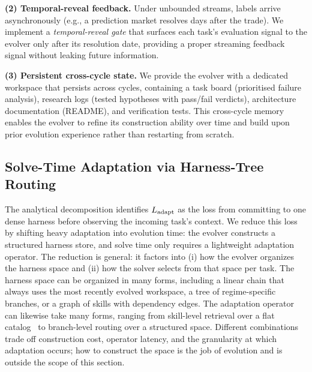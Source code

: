 \noindent\textbf{(2) Temporal-reveal feedback.}
Under unbounded streams, labels arrive asynchronously (e.g., a prediction market resolves days after the trade). We implement a \emph{temporal-reveal gate} that surfaces each task's evaluation signal to the evolver only after its resolution date, providing a proper streaming feedback signal without leaking future information.

\noindent\textbf{(3) Persistent cross-cycle state.}
We provide the evolver with a dedicated workspace that persists across cycles, containing a task board (prioritised failure analysis), research logs (tested hypotheses with pass/fail verdicts), architecture documentation (README), and verification tests. This cross-cycle memory enables the evolver to refine its construction ability over time and build upon prior evolution experience rather than restarting from scratch.




\subsection{Solve-Time Adaptation via Harness-Tree Routing}
\label{sec:method-nav}

The analytical decomposition identifies $L_{\text{adapt}}$ as the loss from committing to one dense harness before observing the incoming task's context. We reduce this loss by shifting heavy adaptation into evolution time: the evolver constructs a structured harness store, and solve time only requires a lightweight adaptation operator. The reduction is general: it factors into (i) how the evolver organizes the harness space and (ii) how the solver selects from that space per task. The harness space can be organized in many forms, including a linear chain that always uses the most recently evolved workspace, a tree of regime-specific branches, or a graph of skills with dependency edges. The adaptation operator can likewise take many forms, ranging from skill-level retrieval over a flat catalog~\cite{deerflow2025} to branch-level routing over a structured space. Different combinations trade off construction cost, operator latency, and the granularity at which adaptation occurs; how to construct the space is the job of evolution and is outside the scope of this section.


